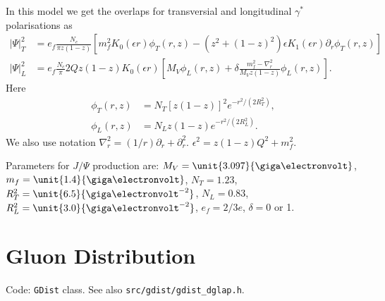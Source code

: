 \documentclass[a4paper,12pt]{article}
\newcommand{\code}[1]{\texttt{#1}}
\begin{document}
In this model we get the overlaps for transversial and longitudinal $\gamma^*$ polarisations as
\begin{align}
	|\Psi |^2_T &= e_f \frac{N_c}{\pi z(1-z)} \left[ m_f^2 K_0(\epsilon r)\phi_T(r,z) - (z^2 + (1-z)^2) \epsilon K_1(\epsilon r) \partial_r \phi_T(r,z) \right] \\
	|\Psi |^2_L &= e_f \frac{N_c}{\pi} 2Q z (1-z)K_0(\epsilon r) \left[ M_V \phi_L(r,z) + \delta \frac{m_f^2 - \nabla_r^2}{M_V z(1-z)}\phi_L(r,z) \right].
\end{align}
Here
\begin{align}
	\phi_T(r,z) &= N_T \left[ z(1-z)\right]^2 e^{-r^2/(2R_T^2)}, \\
	\phi_L(r,z) &= N_L z(1-z) e^{-r^2/(2R_L^2)}.
\end{align}
We also use notation $\nabla_r^2 = (1/r)\partial_r + \partial_r^2$. $\epsilon^2=z(1-z)Q^2+m_f^2$.

Parameters for $J/\Psi$ production are: $M_V = \unit{3.097}{\giga\electronvolt}$, $m_f = \unit{1.4}{\giga\electronvolt}$, $N_T = 1.23$, $R_T^2 = \unit{6.5}{\giga\electronvolt^{-2}}$, $N_L=0.83$, $R_L^2 = \unit{3.0}{\giga\electronvolt^{-2}}$, $e_f = 2/3 e$, $\delta = 0$ or 1.


\section{Gluon Distribution}
\label{gdist}
Code: \code{GDist} class. See also \code{src/gdist/gdist\_dglap.h}.


\end{document}
